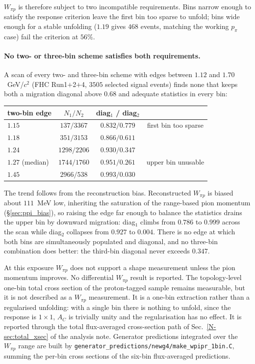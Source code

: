 \documentclass[11pt,a4paper]{article}
\newcommand{\noteref}[2]{#1~\ref{N-#2} of the analysis note}
\begin{document}
$W_{\pi p}$ is therefore subject to two incompatible requirements. Bins narrow enough to
satisfy the response criterion leave the first bin too sparse to unfold; bins wide enough
for a stable unfolding ($1.19$ gives $468$ events, matching the working $p_\pi$ case) fail
the criterion at $56\%$.

\paragraph{No two- or three-bin scheme satisfies both requirements.} A scan of every two-
and three-bin scheme with edges between $1.12$ and $1.70$~GeV/$c^2$ (FHC Run1$+$2$+$4,
$3505$ selected signal events) finds none that keeps both a migration diagonal above $0.68$
and adequate statistics in every bin:

\begin{center}\small
\begin{tabular}{lccc}
\toprule
two-bin edge & $N_1 / N_2$ & diag$_1$ / diag$_2$ & \\\midrule
$1.15$ & $137 / 3367$  & $0.832 / 0.779$ & first bin too sparse \\
$1.18$ & $351 / 3153$  & $0.866 / 0.611$ & \\
$1.24$ & $1298 / 2206$ & $0.930 / 0.347$ & \\
$1.27$ (median) & $1744 / 1760$ & $0.951 / \mathbf{0.261}$ & upper bin unusable \\
$1.45$ & $2966 / 538$  & $0.993 / 0.030$ & \\
\bottomrule
\end{tabular}
\end{center}

\noindent The trend follows from the reconstruction bias. Reconstructed $W_{\pi p}$ is biased about
$111$~MeV low, inheriting the saturation of the range-based pion momentum
(\S\ref{sec:ppi_bias}), so raising the edge far enough to balance the statistics drains the
upper bin by downward migration: diag$_1$ climbs from $0.786$ to $0.999$ across the scan
while diag$_2$ collapses from $0.927$ to $0.004$. There is no edge at which both bins are
simultaneously populated and diagonal, and no three-bin combination does better: the
third-bin diagonal never exceeds $0.347$.

At this exposure $W_{\pi p}$ does not support a shape measurement unless the pion momentum
improves. No differential $W_{\pi p}$ result is reported. The topology-level one-bin total cross
section of the proton-tagged sample remains measurable, but it is not described as a $W_{\pi p}$
measurement. It is a one-bin extraction rather than a regularised unfolding: with a single bin there
is nothing to unfold, since the response is $1\times1$, $A_C$ is trivially unity and the
regularisation has no effect. It is reported through the total flux-averaged cross-section
path of \noteref{Sec.}{sec:total_xsec}. Generator predictions integrated over the $W_{\pi p}$ range
are built by \texttt{generator\_predictions/newg4/make\_wpipr\_1bin.C}, summing the per-bin
cross sections of the six-bin flux-averaged predictions.
\end{document}
